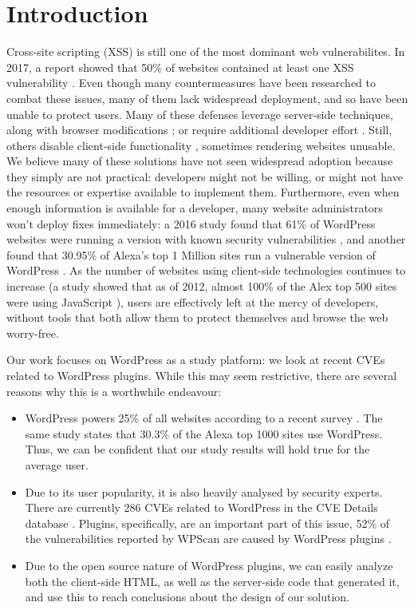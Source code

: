\section{Introduction}

Cross-site scripting (XSS) is still one of the most dominant web vulnerabilites. In 2017, a report showed that 50\% of websites contained at least one XSS vulnerability \cite{Acunetix}. Even though many countermeasures have been researched to combat these issues, many of them lack widespread deployment, and so have been unable to protect users. Many of these defenses leverage server-side techniques, along with browser modifications \cite{Jim:2007:DSI:1242572.1242654,Nadji:2009,Wurzinger:2009:SMX:1656360.1656379}; or require additional developer effort \cite{10.1007/978-3-319-66399-9_7}. Still, others disable client-side functionality \cite{Noscript,Snyder:2017:MWD:3133956.3133966}, sometimes rendering websites unusable. We believe many of these solutions have not seen widespread adoption because they simply are not practical: developers might not be willing, or might not have the resources or expertise available to implement them. Furthermore, even when enough information is available for a developer, many website administrators won't deploy fixes immediately: a 2016 study found that 61\% of WordPress websites were running a version with known security vulnerabilities \cite{Sucuri}, and another found that 30.95\% of Alexa's top 1 Million sites run a vulnerable version of WordPress \cite{wpwhitesecurity}. As the number of websites using client-side technologies continues to increase (a study showed that as of 2012, almost 100\% of the Alex top 500 sites were using JavaScript \cite{Stock:2017:WTI:3241189.3241265}), users are effectively left at the mercy of developers, without tools that both allow them to protect themselves and browse the web worry-free.

Our work focuses on WordPress as a study platform: we look at recent CVEs related to WordPress plugins. While this may seem restrictive, there are several reasons why this is a worthwhile endeavour:
\begin{itemize}
	\item WordPress powers 25\% of all websites according to a recent survey  \cite{w3techs}. The same study states that 30.3\% of the Alexa top 1000 sites use WordPress. Thus, we can be confident that our study results will hold true for the average user.
	\item Due to its user popularity, it is also heavily analysed by security experts. There are currently 286 CVEs related to WordPress in the CVE Details database \cite{cvedetails}. Plugins, specifically, are an important part of this issue, 52\% of the vulnerabilities reported by WPScan are caused by WordPress plugins \cite{wpscan}.
	\item Due to the open source nature of WordPress plugins, we can easily analyze both the client-side HTML, as well as the server-side code that generated it, and use this to reach conclusions about the design of our solution.
	
\end{itemize}

